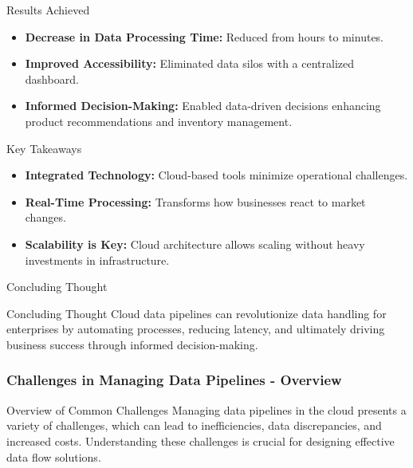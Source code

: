 \documentclass[aspectratio=169]{beamer}
\begin{document}
\begin{frame}[fragile]{Results Achieved}
    \begin{itemize}
        \item \textbf{Decrease in Data Processing Time:} Reduced from hours to minutes.
        \item \textbf{Improved Accessibility:} Eliminated data silos with a centralized dashboard.
        \item \textbf{Informed Decision-Making:} Enabled data-driven decisions enhancing product recommendations and inventory management.
    \end{itemize}
\end{frame}

\begin{frame}[fragile]{Key Takeaways}
    \begin{itemize}
        \item \textbf{Integrated Technology:} Cloud-based tools minimize operational challenges.
        \item \textbf{Real-Time Processing:} Transforms how businesses react to market changes.
        \item \textbf{Scalability is Key:} Cloud architecture allows scaling without heavy investments in infrastructure.
    \end{itemize}
\end{frame}

\begin{frame}[fragile]{Concluding Thought}
    \begin{block}{Concluding Thought}
        Cloud data pipelines can revolutionize data handling for enterprises by automating processes, reducing latency, and ultimately driving business success through informed decision-making.
    \end{block}
\end{frame}

\begin{frame}[fragile]
  \frametitle{Challenges in Managing Data Pipelines - Overview}
  \begin{block}{Overview of Common Challenges}
    Managing data pipelines in the cloud presents a variety of challenges, which can lead to inefficiencies, data discrepancies, and increased costs. Understanding these challenges is crucial for designing effective data flow solutions.
  \end{block}
\end{frame}
\end{document}

